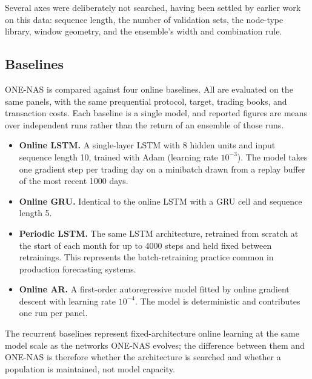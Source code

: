 Several axes were deliberately not searched, having been settled by
earlier work on this data: sequence length, the number of validation
sets, the node-type library, window geometry, and the ensemble's width
and combination rule.

\subsection{Baselines}

ONE-NAS is compared against four online baselines. All are evaluated on
the same panels, with the same prequential protocol, target, trading
books, and transaction costs. Each baseline is a single model, and
reported figures are means over independent runs rather than the return
of an ensemble of those runs.

\begin{itemize}\itemsep2pt
\item \textbf{Online LSTM.} A single-layer LSTM with 8 hidden units and
      input sequence length 10, trained with Adam (learning rate
      $10^{-3}$). The model takes one gradient step per trading day on a
      minibatch drawn from a replay buffer of the most recent 1000 days.
\item \textbf{Online GRU.} Identical to the online LSTM with a GRU cell
      and sequence length 5.
\item \textbf{Periodic LSTM.} The same LSTM architecture, retrained from
      scratch at the start of each month for up to 4000 steps and held
      fixed between retrainings. This represents the batch-retraining
      practice common in production forecasting systems.
\item \textbf{Online AR.} A first-order autoregressive model fitted by
      online gradient descent with learning rate $10^{-4}$. The model is
      deterministic and contributes one run per panel.
\end{itemize}

The recurrent baselines represent fixed-architecture online learning at
the same model scale as the networks ONE-NAS evolves; the difference
between them and ONE-NAS is therefore whether the architecture is
searched and whether a population is maintained, not model capacity.



